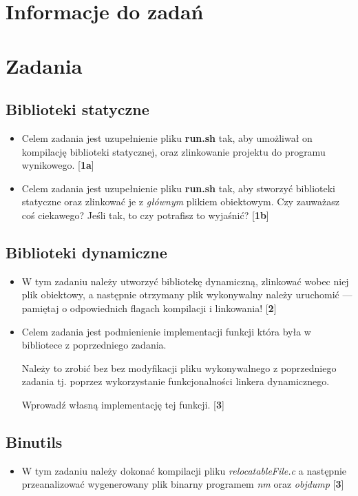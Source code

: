 \documentclass[12pt]{article}
\begin{document}

\tableofcontents
\pagebreak



\section{Informacje do zadań}

\section{Zadania}
\subsection{Biblioteki statyczne}
\begin{itemize}
\item Celem zadania jest uzupełnienie pliku \textbf{run.sh} tak, aby
  umożliwał on kompilację biblioteki statycznej, oraz zlinkowanie projektu do
  programu wynikowego. [\textbf{1a}]
\item Celem zadania jest uzupełnienie pliku \textbf{run.sh} tak, aby
  stworzyć biblioteki statyczne oraz zlinkować je z \textit{głównym} plikiem
  obiektowym. Czy zauważasz coś ciekawego? Jeśli tak, to czy potrafisz to
  wyjaśnić? [\textbf{1b}]
\end{itemize}
\subsection{Biblioteki dynamiczne}
\begin{itemize}
\item W tym zadaniu należy utworzyć bibliotekę dynamiczną, zlinkować wobec niej
  plik obiektowy, a następnie otrzymany plik wykonywalny należy uruchomić ---
  pamiętaj o odpowiednich flagach kompilacji i linkowania! [\textbf{2}]
\item Celem zadania jest podmienienie implementacji funkcji która była w
  bibliotece z poprzedniego zadania.

  Należy to zrobić bez bez modyfikacji pliku wykonywalnego z poprzedniego
  zadania tj. poprzez wykorzystanie funkcjonalności linkera dynamicznego.

  Wprowadź własną implementację tej funkcji. [\textbf{3}]
\end{itemize}
\subsection{Binutils}
\begin{itemize}
\item W tym zadaniu należy dokonać kompilacji pliku \textit{relocatableFile.c}
  a następnie przeanalizować wygenerowany plik binarny programem \textit{nm}
  oraz \textit{objdump} [\textbf{3}]
\end{itemize}
\end{document}
